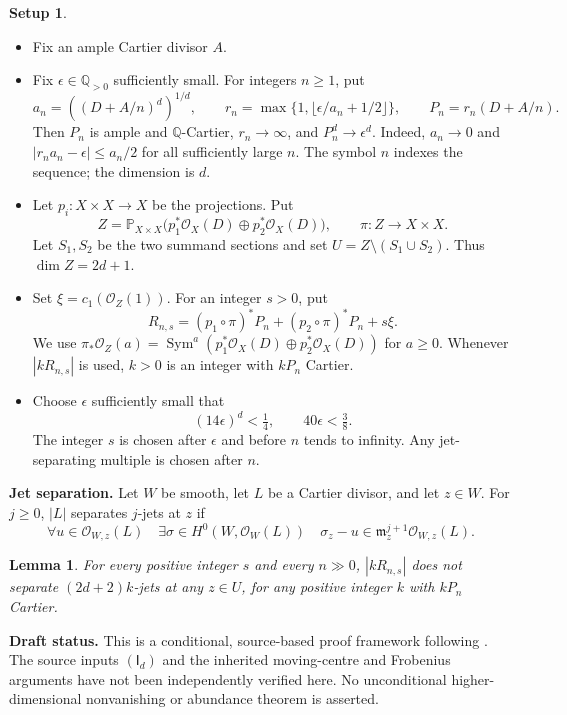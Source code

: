 \documentclass[12pt,a4paper,psamsfonts]{amsart}
\theoremstyle{definition}
\newtheorem*{setup}{Setup}
\theoremstyle{plain}
\newtheorem{lemma}{Lemma}[section]
\newcommand{\Q}{\mathbb Q}
\newcommand{\OO}{\mathcal O}
\newcommand{\PP}{\mathbb P}
\begin{document}
\begin{setup}
\leavevmode
\begin{itemize}
\setlength{\itemsep}{2pt}
\setlength{\parsep}{0pt}
\item Fix an ample Cartier divisor $A$.
\item Fix $\epsilon\in\Q_{>0}$ sufficiently small. For integers
$n\ge1$, put
\[
 a_n=((D+A/n)^d)^{1/d},\qquad
 r_n=\max\{1,\lfloor\epsilon/a_n+1/2\rfloor\},\qquad
 P_n=r_n(D+A/n).
\]
Then $P_n$ is ample and $\mathbb{Q}$-Cartier, $r_n\to\infty$, and
$P_n^d\to\epsilon^d$. Indeed, $a_n\to0$ and
$|r_na_n-\epsilon|\le a_n/2$ for all sufficiently large $n$.
The symbol $n$ indexes the sequence; the dimension is $d$.
\item Let $p_i:X\times X\to X$ be the projections. Put
\[
 Z=\PP_{X\times X}
       \bigl(p_1^*\OO_X(D)\oplus p_2^*\OO_X(D)\bigr),
 \qquad \pi:Z\to X\times X.
\]
Let $S_1,S_2$ be the two summand sections and set
$U=Z\setminus(S_1\cup S_2)$. Thus $\dim Z=2d+1$.
\item Set $\xi=c_1(\OO_Z(1))$. For an integer $s>0$, put
\[
 R_{n,s}=(p_1\circ\pi)^*P_n+(p_2\circ\pi)^*P_n+s\xi.
\]
We use $\pi_*\OO_Z(a)=\operatorname{Sym}^a
(p_1^*\OO_X(D)\oplus p_2^*\OO_X(D))$ for $a\ge0$.
Whenever $|kR_{n,s}|$ is used, $k>0$ is an integer with
$kP_n$ Cartier.
\item Choose $\epsilon$ sufficiently small that
\[
 (14\epsilon)^d<\tfrac14,\qquad40\epsilon<\tfrac38.
\]
The integer $s$ is chosen after $\epsilon$ and before $n$ tends
to infinity. Any jet-separating multiple is chosen after $n$.
\end{itemize}
\end{setup}

\medskip
\noindent\textbf{Jet separation.}
Let $W$ be smooth, let $L$ be a Cartier divisor, and let $z\in W$.
For $j\ge0$, $|L|$ separates $j$-jets at $z$ if
\[
 \forall u\in\OO_{W,z}(L)\quad
 \exists\sigma\in H^0(W,\OO_W(L))\quad
 \sigma_z-u\in\mathfrak m_z^{j+1}\OO_{W,z}(L).
\]
\setcounter{lemma}{1}

\begin{lemma}\label{lem:general-nojets}
For every positive integer $s$ and every $n\gg0$,
$|kR_{n,s}|$ does not separate $(2d+2)k$-jets at any $z\in U$,
for any positive integer $k$ with $kP_n$ Cartier.
\end{lemma}

\medskip
\noindent\textbf{Draft status.}
This is a conditional, source-based proof framework following
\cite[Sections~4--6]{NS}. The source inputs $(\mathsf I_d)$ and
the inherited moving-centre and Frobenius arguments have not been
independently verified here. No unconditional higher-dimensional
nonvanishing or abundance theorem is asserted.
\end{document}
